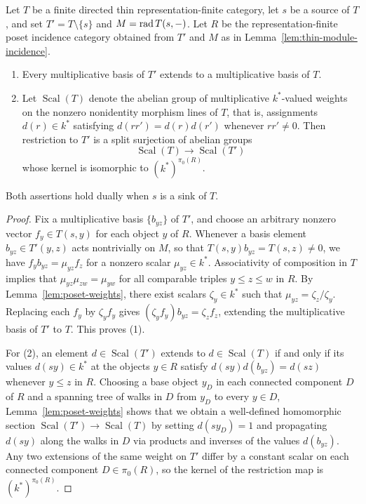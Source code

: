 \begin{lemma}
\label{lem:source-basis-extension}
Let $T$ be a finite directed thin representation-finite category, let $s$ be
a source of $T$, and set $T'=T\setminus\{s\}$ and $M=\operatorname{rad} T(s,-)$. Let $R$ be
the representation-finite poset incidence category obtained from $T'$ and $M$
as in Lemma~\ref{lem:thin-module-incidence}.
\begin{enumerate}[label={\upshape(\arabic*)}]
\item Every multiplicative basis of $T'$ extends to a multiplicative basis of
$T$.
\item Let $\operatorname{Scal}(T)$ denote the abelian group of multiplicative
$k^*$-valued weights on the nonzero nonidentity morphism lines of $T$, that
is, assignments $d(r)\in k^*$ satisfying $d(rr')=d(r)d(r')$ whenever
$rr'\ne0$. Then restriction to $T'$ is a split surjection of abelian groups
\[
 \operatorname{Scal}(T)\longrightarrow \operatorname{Scal}(T')
\]
whose kernel is isomorphic to $(k^*)^{\pi_0(R)}$.
\end{enumerate}
Both assertions hold dually when $s$ is a sink of $T$.
\end{lemma}
\begin{proof}
Fix a multiplicative basis $\{b_{yz}\}$ of $T'$, and choose an arbitrary
nonzero vector $f_y\in T(s,y)$ for each object $y$ of $R$. Whenever a basis
element $b_{yz}\in T'(y,z)$ acts nontrivially on $M$, so that
$T(s,y)b_{yz}=T(s,z)\ne0$, we have $f_y b_{yz}=\mu_{yz}f_z$ for a nonzero
scalar $\mu_{yz}\in k^*$. Associativity of composition in $T$ implies that
$\mu_{yz}\mu_{zw}=\mu_{yw}$ for all comparable triples $y\leq z\leq w$ in
$R$. By Lemma~\ref{lem:poset-weights}, there exist scalars $\zeta_y\in k^*$
such that $\mu_{yz}=\zeta_z/\zeta_y$. Replacing each $f_y$ by $\zeta_y f_y$
gives $(\zeta_y f_y)b_{yz}=\zeta_z f_z$, extending the multiplicative basis
of $T'$ to $T$. This proves (1).

For (2), an element $d\in\operatorname{Scal}(T')$ extends to $d\in\operatorname{Scal}(T)$
if and only if its values $d(sy)\in k^*$ at the objects $y\in R$ satisfy
$d(sy)d(b_{yz})=d(sz)$ whenever $y\leq z$ in $R$. Choosing a base object
$y_D$ in each connected component $D$ of $R$ and a spanning tree of walks in
$D$ from $y_D$ to every $y\in D$, Lemma~\ref{lem:poset-weights} shows that we
obtain a well-defined homomorphic section
$\operatorname{Scal}(T')\to\operatorname{Scal}(T)$ by setting $d(sy_D)=1$ and
propagating $d(sy)$ along the walks in $D$ via products and inverses of the
values $d(b_{yz})$. Any two extensions of the same weight on $T'$ differ by a
constant scalar on each connected component $D\in\pi_0(R)$, so the kernel of
the restriction map is $(k^*)^{\pi_0(R)}$.
\end{proof}

